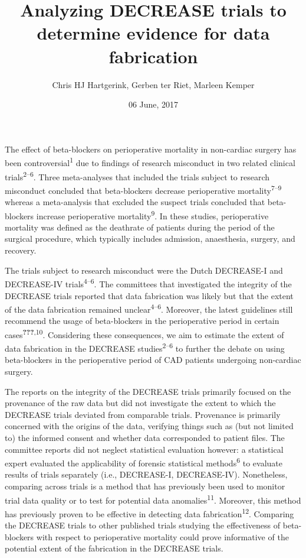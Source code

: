 \documentclass[]{article}
\title{Analyzing DECREASE trials to determine evidence for data fabrication}
\author{Chris HJ Hartgerink, Gerben ter Riet, Marleen Kemper}
\date{06 June, 2017}
\begin{document}
\maketitle

The effect of beta-blockers on perioperative mortality in non-cardiac
surgery has been controversial\textsuperscript{1} due to findings of
research misconduct in two related clinical
trials\textsuperscript{2--6}. Three meta-analyses that included the
trials subject to research misconduct concluded that beta-blockers
decrease perioperative mortality\textsuperscript{7--9} whereas a
meta-analysis that excluded the suspect trials concluded that
beta-blockers increase perioperative mortality\textsuperscript{9}. In
these studies, perioperative mortality was defined as the deathrate of
patients during the period of the surgical procedure, which typically
includes admission, anaesthesia, surgery, and recovery.

The trials subject to research misconduct were the Dutch DECREASE-I and
DECREASE-IV trials\textsuperscript{4--6}. The committees that
investigated the integrity of the DECREASE trials reported that data
fabrication was likely but that the extent of the data fabrication
remained unclear\textsuperscript{4--6}. Moreover, the latest guidelines
still recommend the usage of beta-blockers in the perioperative period
in certain cases\textsuperscript{{\textbf{???}},10}. Considering these
consequences, we aim to estimate the extent of data fabrication in the
DECREASE studies\textsuperscript{2--6} to further the debate on using
beta-blockers in the perioperative period of CAD patients undergoing
non-cardiac surgery.

The reports on the integrity of the DECREASE trials primarily focused on
the provenance of the raw data but did not investigate the extent to
which the DECREASE trials deviated from comparable trials. Provenance is
primarily concerned with the origins of the data, verifying things such
as (but not limited to) the informed consent and whether data
corresponded to patient files. The committee reports did not neglect
statistical evaluation however: a statistical expert evaluated the
applicability of forensic statistical methods\textsuperscript{6} to
evaluate results of trials separately (i.e., DECREASE-I, DECREASE-IV).
Nonetheless, comparing across trials is a method that has previously
been used to monitor trial data quality or to test for potential data
anomalies\textsuperscript{11}. Moreover, this method has previously
proven to be effective in detecting data
fabrication\textsuperscript{12}. Comparing the DECREASE trials to other
published trials studying the effectiveness of beta-blockers with
respect to perioperative mortality could prove informative of the
potential extent of the fabrication in the DECREASE trials.
\end{document}

